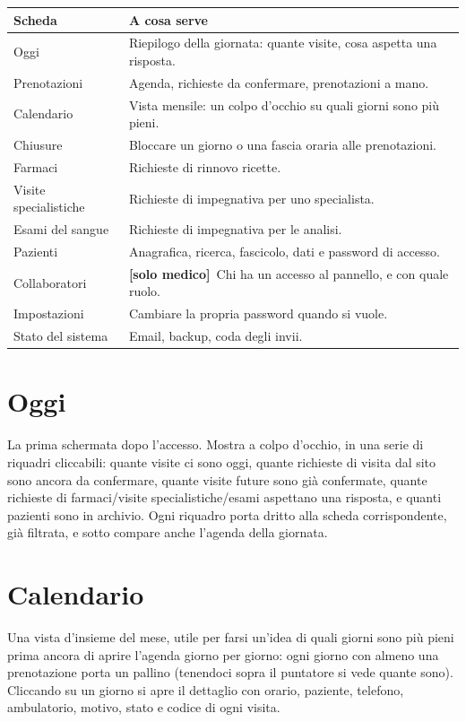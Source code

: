 \documentclass[11pt,a4paper]{article}
\newcommand{\solomedico}{\textcolor{studioarancio}{\textbf{[solo medico]}}\ }
\begin{document}
\begin{center}
\begin{tabularx}{\linewidth}{lX}
\toprule
\textbf{Scheda} & \textbf{A cosa serve} \\
\midrule
Oggi & Riepilogo della giornata: quante visite, cosa aspetta una risposta. \\
Prenotazioni & Agenda, richieste da confermare, prenotazioni a mano. \\
Calendario & Vista mensile: un colpo d'occhio su quali giorni sono più pieni. \\
Chiusure & Bloccare un giorno o una fascia oraria alle prenotazioni. \\
Farmaci & Richieste di rinnovo ricette. \\
Visite specialistiche & Richieste di impegnativa per uno specialista. \\
Esami del sangue & Richieste di impegnativa per le analisi. \\
Pazienti & Anagrafica, ricerca, fascicolo, dati e password di accesso. \\
Collaboratori & \solomedico Chi ha un accesso al pannello, e con quale ruolo. \\
Impostazioni & Cambiare la propria password quando si vuole. \\
Stato del sistema & Email, backup, coda degli invii. \\
\bottomrule
\end{tabularx}
\end{center}

\section{Oggi}

La prima schermata dopo l'accesso. Mostra a colpo d'occhio, in una serie di riquadri cliccabili: quante visite ci sono oggi, quante richieste di visita dal sito sono ancora da confermare, quante visite future sono già confermate, quante richieste di farmaci/visite specialistiche/esami aspettano una risposta, e quanti pazienti sono in archivio. Ogni riquadro porta dritto alla scheda corrispondente, già filtrata, e sotto compare anche l'agenda della giornata.

\section{Calendario}

Una vista d'insieme del mese, utile per farsi un'idea di quali giorni sono più pieni prima ancora di aprire l'agenda giorno per giorno: ogni giorno con almeno una prenotazione porta un pallino (tenendoci sopra il puntatore si vede quante sono). Cliccando su un giorno si apre il dettaglio con orario, paziente, telefono, ambulatorio, motivo, stato e codice di ogni visita.
\end{document}
